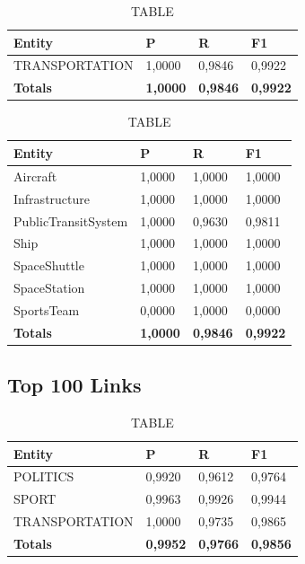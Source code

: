 \documentclass[thesis=M,english]{FITthesis}[2018/05/30]
\begin{document}
	
	\begin{table}[H]\centering
		\caption{TABLE}
		\label{}
		\begin{tabular}{|l|l|l|l|}
			\hline {\textbf{Entity}} & {\textbf{P}} & {\textbf{R}} & {\textbf{F1}}\\\hline
				TRANSPORTATION & 1,0000 & 0,9846 & 0,9922\\\hline
				\textbf{Totals} & \textbf{1,0000} & \textbf{0,9846} & \textbf{0,9922}\\\hline
		\end{tabular}
	\end{table}	

	\begin{table}[H]\centering
		\caption{TABLE}
		\label{}
		\begin{tabular}{|l|l|l|l|}
			\hline {\textbf{Entity}} & {\textbf{P}} & {\textbf{R}} & {\textbf{F1}}\\\hline
				Aircraft & 1,0000 & 1,0000 & 1,0000\\
				Infrastructure & 1,0000 & 1,0000 & 1,0000\\
				PublicTransitSystem & 1,0000 & 0,9630 & 0,9811\\
				Ship & 1,0000 & 1,0000 & 1,0000\\				
				SpaceShuttle & 1,0000 & 1,0000 & 1,0000\\
				SpaceStation & 1,0000 & 1,0000 & 1,0000\\
				SportsTeam & 0,0000 & 1,0000 & 0,0000\\\hline
				\textbf{Totals} & \textbf{1,0000} & \textbf{0,9846} & \textbf{0,9922}\\\hline
		\end{tabular}
	\end{table}	


\subsection{Top 100 Links}


	\begin{table}[H]\centering
		\caption{TABLE}
		\label{}
		\begin{tabular}{|l|l|l|l|}
			\hline {\textbf{Entity}} & {\textbf{P}} & {\textbf{R}} & {\textbf{F1}}\\\hline
				POLITICS & 0,9920 & 0,9612 & 0,9764\\
				SPORT & 0,9963 & 0,9926 & 0,9944\\
				TRANSPORTATION & 1,0000 & 0,9735 & 0,9865\\\hline
				\textbf{Totals} & \textbf{0,9952} & \textbf{0,9766} & \textbf{0,9856}\\\hline
		\end{tabular}
	\end{table}
\end{document}
